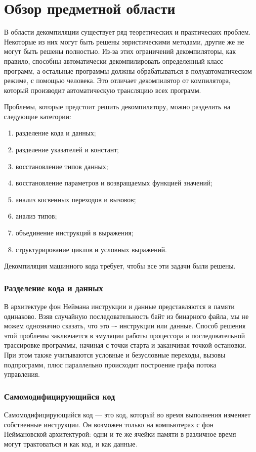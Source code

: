\section{Обзор предметной области}

В области декомпиляции существует ряд теоретических и практических проблем. Некоторые из них могут быть решены эвристическими методами, другие же не могут быть решены полностью. Из-за этих ограничений декомпиляторы, как правило, способны автоматически декомпилировать определенный класс программ, а остальные программы должны обрабатываться в полуавтоматическом режиме, с помощью человека. Это отличает декомпилятор от компилятора, который производит автоматическую трансляцию всех программ\cite{decompilation}.

Проблемы, которые предстоит решить декомпилятору, можно разделить на следующие категории:

\begin{enumerate}
\item разделение кода и данных;
\item разделение указателей и констант;
\item восстановление типов данных;
\item восстановление параметров и возвращаемых функцией значений;
\item анализ косвенных переходов и вызовов;
\item анализ типов;
\item объединение инструкций в выражения;
\item структурирование циклов и условных выражений.
\end{enumerate}

Декомпиляция машинного кода требует, чтобы все эти задачи были решены\cite{problems}.

\subsubsection*{Разделение кода и данных}
В архитектуре фон Неймана инструкции и данные представляются в памяти одинаково. Взяв случайную последовательность байт из бинарного файла, мы не можем однозначно сказать, что это –- инструкции или данные. Способ решения этой проблемы заключается в эмуляции работы процессора и последовательной трассировке программы, начиная с точки старта и заканчивая точкой остановки. При этом также учитываются условные и безусловные переходы, вызовы подпрограмм, плюс параллельно происходит построение графа потока управления.
\subsubsection*{Самомодифицирующийся код}
Самомодифицирующийся код --- это код, который во время выполнения изменяет собственные инструкции. Он возможен только на компьютерах с фон Неймановской архитектурой: одни и те же ячейки памяти в различное время могут трактоваться и как код, и как данные.
